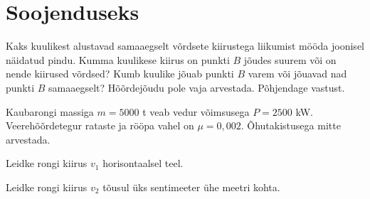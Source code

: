 \documentclass[a4paper,11pt,twocolumn]{article}
\begin{document}
\section{Soojenduseks}
\begin{question}[Piirk 2018, P3][dun7][3.5cm]
	Kaks kuulikest alustavad samaaegselt võrdsete kiirustega liikumist mööda joonisel näidatud pindu. Kumma kuulikese kiirus on punkti $ B $ jõudes suurem või on nende kiirused võrdsed? Kumb kuulike jõuab punkti $ B $ varem või jõuavad nad punkti $ B $ samaaegselt? Hõõrdejõudu pole vaja arvestada. Põhjendage vastust.
\end{question}
\begin{question}[Lahtine 2014, N4]
	Kaubarongi massiga $ m = 5000 $ t veab vedur võimsusega $ P = 2500 $ kW. Veerehõõrdetegur rataste ja rööpa vahel on $ \mu = 0,002 $. Õhutakistusega mitte arvestada.
	\begin{subquestion}
		\item Leidke rongi kiirus $ v_1 $ horisontaalsel teel.
		\item Leidke rongi kiirus $ v_2 $ tõusul üks sentimeeter ühe meetri kohta.
	\end{subquestion}	
\end{question}
\end{document}

